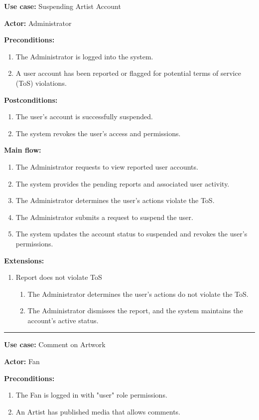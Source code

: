 \documentclass{article}
\begin{document}
{\bfseries Use case:} Suspending Artist Account

{\bfseries Actor:} Administrator

{\bfseries Preconditions:}
\begin{enumerate}
	\item The Administrator is logged into the system.
	\item A user account has been reported or flagged for potential terms of service (ToS) violations.
\end{enumerate}

{\bfseries Postconditions:}
\begin{enumerate}
	\item The user's account is successfully suspended.
	\item The system revokes the user's access and permissions.
\end{enumerate}

{\bfseries Main flow:}
\begin{enumerate}
	\item The Administrator requests to view reported user accounts.
	\item The system provides the pending reports and associated user activity.
	\item The Administrator determines the user's actions violate the ToS.
	\item The Administrator submits a request to suspend the user.
	\item The system updates the account status to suspended and revokes the user's permissions.
\end{enumerate}

{\bfseries Extensions:}
\begin{enumerate}
	\item [3a.] Report does not violate ToS
	\begin{enumerate}
		\item [3a1.] The Administrator determines the user's actions do not violate the ToS.
		\item [3a2.] The Administrator dismisses the report, and the system maintains the account's active status.
	\end{enumerate}
\end{enumerate}


\hrule
\bigskip

{\bfseries Use case:} Comment on Artwork

{\bfseries Actor:} Fan

{\bfseries Preconditions:}
\begin{enumerate}
	\item The Fan is logged in with "user" role permissions.
	\item An Artist has published media that allows comments.
\end{enumerate}
\end{document}
